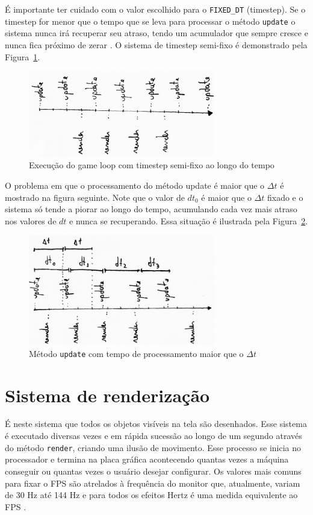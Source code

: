 \documentclass[12pt, 
openright, 
oneside, 
a4paper,    
brazil]{facom-ufu-abntex2}
\begin{document}
É importante ter cuidado com o valor escolhido para o \texttt{FIXED_DT} (timestep). Se o timestep for menor que o tempo que se leva para processar o método \texttt{update} o sistema nunca irá recuperar seu atraso, tendo um acumulador que sempre cresce e nunca fica próximo de zerar \cite{GameProgrammingPatterns}.
O sistema de timestep semi-fixo é demonstrado pela Figura~\ref{fig:timeStepSemiFixo}.
\begin{figure}[H]
	\centering
	\includegraphics[width=22em]{imagens/ilu6_small.png}
	\caption{Execução do game loop com timestep semi-fixo ao longo do tempo}
	\label{fig:timeStepSemiFixo}
\end{figure}
O problema em que o processamento do método update é maior que o $\Delta t$ é mostrado na figura seguinte. Note que o valor de $dt_0$ é maior que o $\Delta t$ fixado e o sistema só tende a piorar ao longo do tempo, acumulando cada vez mais atraso nos valores de $dt$ e nunca se recuperando. Essa situação é ilustrada pela Figura~\ref{fig:updateDelay}.
\begin{figure}[H]
	\centering
	\includegraphics[width=22em]{imagens/ilu8_small.png}
	\caption{Método \texttt{update} com tempo de processamento maior que o $\Delta t$}
	\label{fig:updateDelay}
\end{figure}
 
\section{Sistema de renderização}
É neste sistema que todos os objetos visíveis na tela são desenhados. Esse sistema é executado diversas vezes e em rápida sucessão ao longo de um segundo através do método \texttt{render}, criando uma ilusão de movimento. Esse processo se inicia no processador e termina na placa gráfica acontecendo quantas vezes a máquina conseguir ou quantas vezes o usuário desejar configurar. Os valores mais comuns para fixar o FPS são atrelados à frequência do monitor que, atualmente, variam de 30 Hz até 144 Hz e para todos os efeitos Hertz é uma medida equivalente ao FPS \cite{GameEngineArchitecture}.
\end{document}
